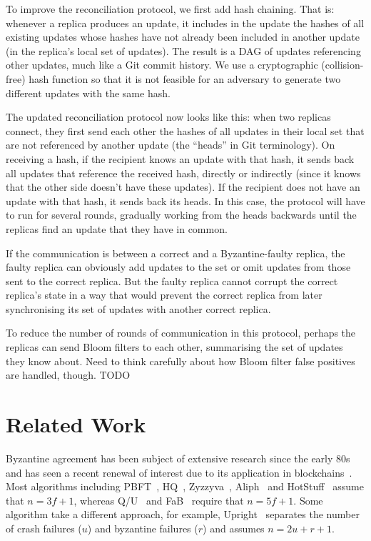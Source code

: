 \documentclass[manuscript]{acmart}
\begin{document}
To improve the reconciliation protocol, we first add hash chaining.
That is: whenever a replica produces an update, it includes in the update the hashes of all existing updates whose hashes have not already been included in another update (in the replica's local set of updates).
The result is a DAG of updates referencing other updates, much like a Git commit history.
We use a cryptographic (collision-free) hash function so that it is not feasible for an adversary to generate two different updates with the same hash.

The updated reconciliation protocol now looks like this: when two replicas connect, they first send each other the hashes of all updates in their local set that are not referenced by another update (the ``heads'' in Git terminology).
On receiving a hash, if the recipient knows an update with that hash, it sends back all updates that reference the received hash, directly or indirectly (since it knows that the other side doesn't have these updates).
If the recipient does not have an update with that hash, it sends back its heads.
In this case, the protocol will have to run for several rounds, gradually working from the heads backwards until the replicas find an update that they have in common.

If the communication is between a correct and a Byzantine-faulty replica, the faulty replica can obviously add updates to the set or omit updates from those sent to the correct replica.
But the faulty replica cannot corrupt the correct replica's state in a way that would prevent the correct replica from later synchronising its set of updates with another correct replica.

To reduce the number of rounds of communication in this protocol, perhaps the replicas can send Bloom filters to each other, summarising the set of updates they know about.
Need to think carefully about how Bloom filter false positives are handled, though. TODO

\section{Related Work}

Byzantine agreement has been subject of extensive research since the early 80s~\cite{Lamport:1982} and has seen a recent renewal of interest due to its application in blockchains~\cite{Bano:2019}.
Most algorithms including PBFT~\cite{Castro:1999}, HQ~\cite{Cowling:2006}, Zyzzyva~\cite{Kotla:2007}, Aliph~\cite{Aublin:2015} and HotStuff~\cite{Yin:2019} assume that $n=3f+1$, whereas Q/U~\cite{Abd:2005} and FaB~\cite{Martin:2006} require that $n=5f+1$.
Some algorithm take a different approach, for example, Upright~\cite{Clement:2009} separates the number of crash failures ($u$) and byzantine failures ($r$) and assumes $n=2u+r+1$.
\end{document}
